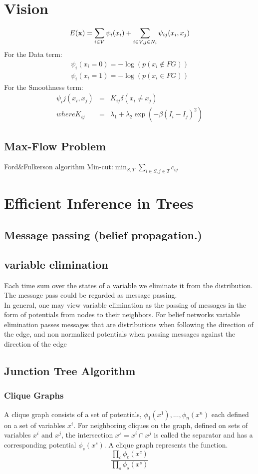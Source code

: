 \documentclass[12pt,a4paper]{article}
\begin{document}
\section{Vision}
$$
E({\bf x}) = \sum_{i\in V}\psi_i(x_i)+\sum_{i\in V,j\in N_i}\psi_{ij}(x_i,x_j)
$$
For the Data term:
\begin{eqnarray*}
\psi_i(x_i=0) = -\log(p(x_i\notin FG))\\
\psi_i(x_i=1) = -\log(p(x_i\in FG))
\end{eqnarray*}
For the Smoothness term:
\begin{eqnarray*}
\psi_ij(x_i,x_j)&=&K_{ij}\delta(x_i\neq x_j)\\
where K_{ij}&=&\lambda_1+\lambda_2\exp(-\beta(I_i-I_j)^2)
\end{eqnarray*}
\subsection*{Max-Flow Problem}
Ford\&Fulkerson algorithm
Min-cut:$\min_{S,T}\sum_{i\in S,j\in T}c_{ij}$
\section*{Efficient Inference in Trees}
\subsection*{Message passing (belief propagation.)}
\subsection*{variable elimination}
Each time sum over the states of a variable we eliminate it from the distribution.\\
The message pass could be regarded as message passing.\\
In general, one may view variable elimination as the passing of messages in the form of potentials from nodes to their neighbors. For belief networks variable elimination passes messages that are distributions when following the direction of the edge, and non normalized potentials when passing messages against the direction of the edge\\
\subsection*{Junction Tree Algorithm}
\subsubsection*{Clique Graphs}
A clique graph consists of a set of potentials, $\phi_1(x^1),\ldots,\phi_n(x^n)$ each defined on a set of variables $x^i$. For neighboring cliques on the graph, defined on sets of variables $x^i$ and $x^j$, the intersection $x^s = x^i \cap x^j$ is called the separator and has a corresponding potential $\phi_s(x^s)$. A clique graph represents the function.
$$
\frac{\prod_{c}\phi_c(x^c)}{\prod_s\phi_s(x^s)}
$$
\end{document}
